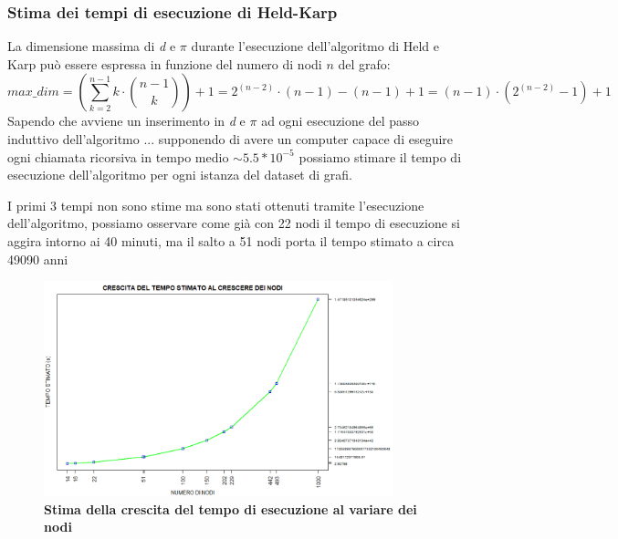 \documentclass[]{article}
\begin{document}
\begin{flushleft}
\newpage
\subsubsection{Stima dei tempi di esecuzione di Held-Karp}
La dimensione massima di \textit{d} e $\pi$ durante l'esecuzione dell'algoritmo di Held e Karp può essere espressa in funzione del numero di nodi $n$ del grafo:
$$max\_dim = (\sum_{k=2}^{n-1}k\cdot\binom{n-1}{k}) + 1 = 2^{(n-2)} \cdot (n-1) - (n-1) +1 = (n-1)\cdot(2^{(n-2)}-1) +1$$
Sapendo che avviene un inserimento in \textit{d} e $\pi$ ad ogni esecuzione del passo induttivo dell'algoritmo ...  supponendo di avere un computer capace di eseguire ogni chiamata ricorsiva in tempo medio $\sim 5.5*10^{-5}$ possiamo stimare il tempo di esecuzione dell'algoritmo per ogni istanza del dataset di grafi.

I primi 3 tempi non sono stime ma sono stati ottenuti tramite l'esecuzione dell'algoritmo, possiamo osservare come già con 22 nodi il tempo di esecuzione si aggira intorno ai 40 minuti, ma il salto a 51 nodi porta il tempo stimato a circa 49090 anni
\begin{figure}[h]
\centering
\includegraphics[width=0.9\textwidth, height=\textheight,keepaspectratio]{STIME_TEMPO.png}
\caption{\textbf{Stima della crescita del tempo di esecuzione al variare dei nodi}}
\label{STIME_temp}
\end{figure}
\end{flushleft}
\end{document}
